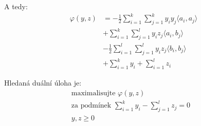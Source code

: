 \begin{multicols}{2}
    A tedy:
    \begin{align}
        \varphi(y, z) &= -\frac{1}{2}\sum_{i=1}^{k}\sum_{j=1}^{k}y_i y_j \langle a_i, a_j\rangle \\
        &+ \sum_{i=1}^{k}\sum_{j=1}^{l}y_i z_j \langle a_i, b_j\rangle \\
        &- \frac{1}{2}\sum_{i=1}^{l}\sum_{j=1}^{l}y_i z_j \langle b_i, b_j\rangle \\
        &+ \sum_{i=1}^{k}y_i + \sum_{i=1}^{l}z_i
    \end{align}
    
    Hledaná duální úloha je:
    \begin{align*}
        \text{maximalisujte } \varphi(y, z) \\
        \text{za podmínek } \sum_{i=1}^{k}y_i - \sum_{j=1}^{l}z_j = 0& \\
        y, z \geq 0& 
    \end{align*}
\end{multicols}
